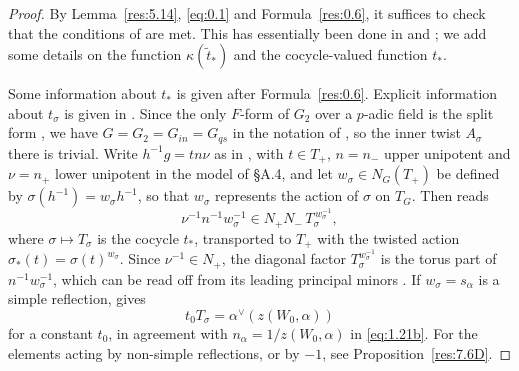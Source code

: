 \documentclass[12pt,letterpaper]{amsart}
\theoremstyle{plain}
\theoremstyle{definition}
\theoremstyle{remark}
\theoremstyle{definition}
\begin{document}
\begin{proof}
By Lemma~\ref{res:5.14}, \eqref{eq:0.1} and Formula~\ref{res:0.6},
it suffices to check that the conditions of \cite{LS83} are met. This
has essentially been done in \cite{La83} and
\cite[Ch.~I, proof of Prop.~5.2]{Ha92a};
we add some details on the function $\kappa(\tilde{t}_*)$
and the cocycle-valued function $t_*$.

Some information about $t_*$ is given after Formula~\ref{res:0.6}.
Explicit information about $t_\sigma$ is given in \cite[Ch.~I, \S5]{Ha92a}.
Since the only $F$-form of $G_2$ over a $p$-adic field is the split form
\cite{Ti65}, we have $G=G_2=G_{in}=G_{qs}$ in the notation of \cite{Ha92a}, so
the inner twist $A_\sigma$ there is trivial. Write $h^{-1}g=tn\nu$ as in
\cite[Ch.~I, proof of Prop.~5.2]{Ha92a}, with $t\in T_+$, $n=n_-$ upper
unipotent and $\nu=n_+$ lower unipotent in the model of \S A.4, and let
$w_\sigma\in N_G(T_+)$ be defined by $\sigma(h^{-1})=w_\sigma h^{-1}$, so that
$w_\sigma$ represents the action of $\sigma$ on $T_G$. Then
\cite[Ch.~I, Eq.~5.3]{Ha92a} reads
\begin{equation}\tag{5.18}\label{eq:5.18}
\nu^{-1}n^{-1}w_\sigma^{-1}\in N_+N_-\,T_\sigma^{\,w_\sigma^{-1}},
\end{equation}
where $\sigma\mapsto T_\sigma$ is the cocycle $t_*$, transported to $T_+$ with
the twisted action $\sigma_*(t)=\sigma(t)^{w_\sigma}$. Since
$\nu^{-1}\in N_+$, the diagonal factor $T_\sigma^{w_\sigma^{-1}}$ is the
torus part of $n^{-1}w_\sigma^{-1}$, which can be read off from its leading
principal minors \cite[Ch.~I, Remark~5.6]{Ha92a}. If $w_\sigma=s_\alpha$ is a
simple reflection, \cite[Ch.~I, Cor.~5.4]{Ha92a} gives
\[
t_0T_\sigma=\alpha^\vee(z(W_0,\alpha))
\]
for a constant $t_0$, in agreement with
$n_\alpha=1/z(W_0,\alpha)$ in \eqref{eq:1.21b}. For the elements acting by
non-simple reflections, or by $-1$, see Proposition~\ref{res:7.6D}.


\end{proof}
\end{document}
